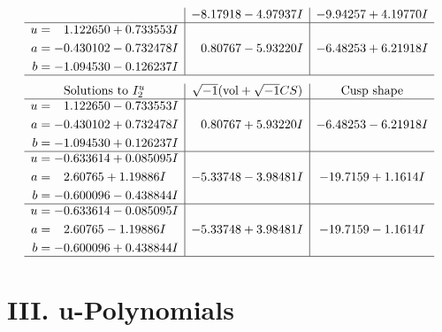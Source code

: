 \documentclass[1p]{elsarticle_modified}
\theoremstyle{definition}
\newcommand{\I}{\sqrt{-1}}
\begin{document}
$$\begin{array}{c|c|c}
 & -8.17918 - 4.97937 I & -9.94257 + 4.19770 I \\ \hline\begin{aligned}
u &= \phantom{-}1.122650 + 0.733553 I \\
a &= -0.430102 - 0.732478 I \\
b &= -1.094530 - 0.126237 I\end{aligned}
 & \phantom{-}0.80767 - 5.93220 I & -6.48253 + 6.21918 I\\
 \hline 
 \end{array}$$\newpage$$\begin{array}{c|c|c}  
\text{Solutions to }I^u_{2}& \I (\text{vol} + \sqrt{-1}CS) & \text{Cusp shape}\\
 \hline 
\begin{aligned}
u &= \phantom{-}1.122650 - 0.733553 I \\
a &= -0.430102 + 0.732478 I \\
b &= -1.094530 + 0.126237 I\end{aligned}
 & \phantom{-}0.80767 + 5.93220 I & -6.48253 - 6.21918 I \\ \hline\begin{aligned}
u &= -0.633614 + 0.085095 I \\
a &= \phantom{-}2.60765 + 1.19886 I \\
b &= -0.600096 - 0.438844 I\end{aligned}
 & -5.33748 - 3.98481 I & -19.7159 + 1.1614 I \\ \hline\begin{aligned}
u &= -0.633614 - 0.085095 I \\
a &= \phantom{-}2.60765 - 1.19886 I \\
b &= -0.600096 + 0.438844 I\end{aligned}
 & -5.33748 + 3.98481 I & -19.7159 - 1.1614 I\\
 \hline 
 \end{array}$$\newpage
\newpage\renewcommand{\arraystretch}{1}
\centering \section*{ III. u-Polynomials}
\end{document}
